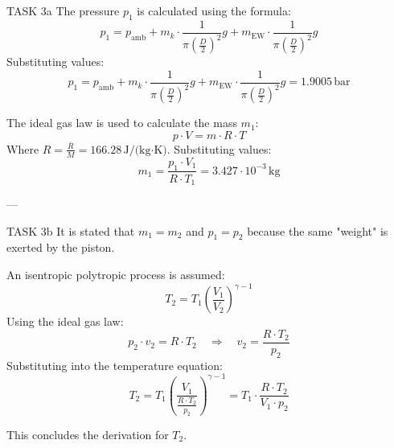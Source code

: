 TASK 3a  
The pressure \( p_1 \) is calculated using the formula:  
\[
p_1 = p_{\text{amb}} + m_k \cdot \frac{1}{\pi \left( \frac{D}{2} \right)^2} g + m_{\text{EW}} \cdot \frac{1}{\pi \left( \frac{D}{2} \right)^2} g
\]  
Substituting values:  
\[
p_1 = p_{\text{amb}} + m_k \cdot \frac{1}{\pi \left( \frac{D}{2} \right)^2} g + m_{\text{EW}} \cdot \frac{1}{\pi \left( \frac{D}{2} \right)^2} g = 1.9005 \, \text{bar}
\]  

The ideal gas law is used to calculate the mass \( m_1 \):  
\[
p \cdot V = m \cdot R \cdot T
\]  
Where \( R = \frac{\bar{R}}{M} = 166.28 \, \text{J/(kg·K)} \).  
Substituting values:  
\[
m_1 = \frac{p_1 \cdot V_1}{R \cdot T_1} = 3.427 \cdot 10^{-3} \, \text{kg}
\]  

---

TASK 3b  
It is stated that \( m_1 = m_2 \) and \( p_1 = p_2 \) because the same "weight" is exerted by the piston.  

An isentropic polytropic process is assumed:  
\[
T_2 = T_1 \left( \frac{V_1}{V_2} \right)^{\gamma - 1}
\]  
Using the ideal gas law:  
\[
p_2 \cdot v_2 = R \cdot T_2 \quad \Rightarrow \quad v_2 = \frac{R \cdot T_2}{p_2}
\]  
Substituting into the temperature equation:  
\[
T_2 = T_1 \left( \frac{V_1}{\frac{R \cdot T_2}{p_2}} \right)^{\gamma - 1} = T_1 \cdot \frac{R \cdot T_2}{V_1 \cdot p_2}
\]  

This concludes the derivation for \( T_2 \).
